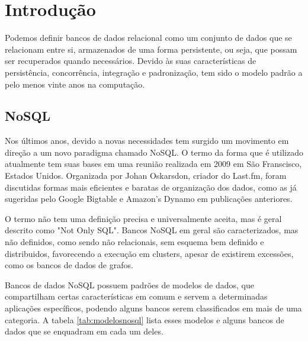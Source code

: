 \chapter{Introdução}

Podemos definir bancos de dados relacional como um conjunto de dados que se relacionam entre si, armazenados de uma forma persistente, ou seja, que possam ser recuperados quando necessários. Devido às suas características de persistência, concorrência, integração e padronização, tem sido o modelo padrão a pelo menos vinte anos na computação\cite{pramod}.

\section{NoSQL}
Nos últimos anos, devido a novas necessidades tem surgido um movimento em direção a um novo paradigma chamado NoSQL. O termo da forma que é utilizado atualmente tem suas bases em uma reunião realizada em 2009 em São Franscisco, Estados Unidos. Organizada por Johan Oskarsdon, criador do Last.fm, foram discutidas formas mais eficientes e baratas de organização dos dados, como as já sugeridas pelo Google Bigtable e Amazon's Dynamo em publicações anteriores\cite{chrisnosql}.

O termo não tem uma definição precisa e universalmente aceita, mas é geral descrito como "Not Only SQL". Bancos NoSQL em geral são caracterizados, mas não definidos, como sendo não relacionais, sem esquema bem definido e distribuidos, favorecendo a execução em clusters, apesar de existirem excessões, como os bancos de dados de grafos.

Bancos de dados NoSQL possuem padrões de modelos de dados, que compartilham certas características em comum e servem a determinadas aplicações específicos, podendo alguns bancos serem classificados em mais de uma categoria. A tabela \ref{tab:modelosnosql} lista esses modelos e alguns bancos de dados que se enquadram em cada um deles.

